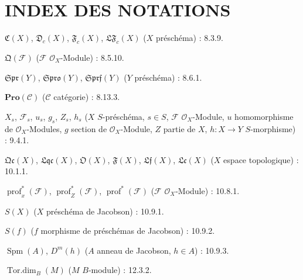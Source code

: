 {}
\section*{INDEX DES NOTATIONS}

\begingroup
\small
\setlength{\parindent}{0pt}
\setlength{\parskip}{2pt}

$\mathfrak C(X)$, $\mathfrak D_c(X)$, $\mathfrak F_c(X)$,
$\mathfrak{LF}_c(X)$ ($X$ préschéma) : 8.3.9.

$\mathfrak Q(\mathcal F)$ ($\mathcal F$ $\mathcal O_X$-Module) : 8.5.10.

$\mathfrak{Spr}(Y)$, $\mathfrak{Spro}(Y)$, $\mathfrak{Sprf}(Y)$
($Y$ préschéma) : 8.6.1.

$\mathbf{Pro}(\mathcal C)$ ($\mathcal C$ catégorie) : 8.13.3.

$X_s$, $\mathcal F_s$, $u_s$, $g_s$, $Z_s$, $h_s$
($X$ $S$-préschéma, $s\in S$, $\mathcal F$ $\mathcal O_X$-Module,
$u$ homomorphisme de $\mathcal O_X$-Modules, $g$ section de
$\mathcal O_X$-Module, $Z$ partie de $X$, $h:X\to Y$ $S$-morphisme) : 9.4.1.

$\mathfrak{Qc}(X)$, $\mathfrak{Lqc}(X)$, $\mathfrak O(X)$,
$\mathfrak F(X)$, $\mathfrak{Lf}(X)$, $\mathfrak{Lc}(X)$
($X$ espace topologique) : 10.1.1.

$\operatorname{prof}^{*}_{x}(\mathcal F)$,
$\operatorname{prof}^{*}_{Z}(\mathcal F)$,
$\operatorname{prof}^{*}(\mathcal F)$
($\mathcal F$ $\mathcal O_X$-Module) : 10.8.1.

$S(X)$ ($X$ préschéma de Jacobson) : 10.9.1.

$S(f)$ ($f$ morphisme de préschémas de Jacobson) : 10.9.2.

$\operatorname{Spm}(A)$, $D^m(h)$ ($A$ anneau de Jacobson, $h\in A$) : 10.9.3.

$\operatorname{Tor.dim}_B(M)$ ($M$ $B$-module) : 12.3.2.

\endgroup

\clearpage
